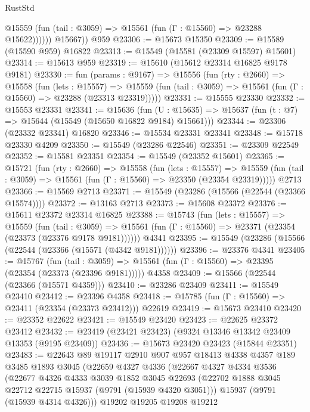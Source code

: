 \begin{lexlean}{RustStd}
\begin{coremodule}
              @15559 (fun (tail : @3059) => @15561 (fun (Γ : @15560) => @23288 @15622))))))
        @15667))
    @959
@23306 := @15673 @15350
@23309 := @15589 (@15590 @959) @16822
@23313 := @15549 (@15581 (@23309 @15597) @15601)
@23314 := @15613 @959
@23319 := @15610 (@15612 @23314 @16825 @9178 @9181)
@23330 := fun (params : @9167) =>
  @15556
    (fun (rty : @2660) =>
    @15558
      (fun (lets : @15557) =>
      @15559 (fun (tail : @3059) => @15561 (fun (Γ : @15560) => @23288 (@23313 @23319)))))
@23331 := @15555 @23330
@23332 := @15553 @23331
@23341 := @15636
    (fun (U : @15635) => @15637 (fun (t : @7) => @15644 (@15549 (@15650 @16822 @9184) @15661)))
@23344 := @23306 (@23332 @23341) @16820
@23346 := @15534 @23331 @23341
@23348 := @15718 @23330 @4209
@23350 := @15549 (@23286 @22546)
@23351 := @23309 @22549
@23352 := @15581 @23351
@23354 := @15549 (@23352 @15601)
@23365 := @15721
    (fun (rty : @2660) =>
    @15558
      (fun (lets : @15557) =>
      @15559 (fun (tail : @3059) => @15561 (fun (Γ : @15560) => @23350 (@23354 @23319)))))
    @2713
@23366 := @15569 @2713
@23371 := @15549 (@23286 (@15566 (@22544 (@23366 @15574))))
@23372 := @13163 @2713
@23373 := @15608 @23372
@23376 := @15611 @23372 @23314 @16825
@23388 := @15743
    (fun (lets : @15557) =>
    @15559
      (fun (tail : @3059) =>
      @15561 (fun (Γ : @15560) => @23371 (@23354 (@23373 (@23376 @9178 @9181))))))
    @4341
@23395 := @15549 (@23286 (@15566 (@22544 (@23366 (@15571 (@4342 @9181))))))
@23396 := @23376 @4341
@23405 := @15767
    (fun (tail : @3059) => @15561 (fun (Γ : @15560) => @23395 (@23354 (@23373 (@23396 @9181)))))
    @4358
@23409 := @15566 (@22544 (@23366 (@15571 @4359)))
@23410 := @23286 @23409
@23411 := @15549 @23410
@23412 := @23396 @4358
@23418 := @15785 (fun (Γ : @15560) => @23411 (@23354 (@23373 @23412))) @22619
@23419 := @15673 @23410
@23420 := @23352 @22622
@23421 := @15549 @23420
@23423 := @22625 @23372 @23412
@23432 := @23419 (@23421 @23423) (@9324 @13346 @13342 @23409 @13353 (@9195 @23409))
@23436 := @15673 @23420 @23423 (@15844 @23351)
@23483 := @22643
    @89
    @19117
    @2910
    @907
    @957
    @18413
    @4338
    @4357
    @189
    @3485
    @1893
    @3045
    (@22659
      @4327
      @4336
      (@22667
        @4327
        @4334
        @3536
        (@22677
          @4326
          @4333
          @3039
          @1852
          @3045
          @22693
          (@22702 @1888 @3045 @22712 @22715 @15937 (@9791 (@15939 @4320 @3051)))
          @15937
          (@9791 (@15939 @4314 @4326)))
        @19202
        @19205
        @19208
        @19212

\end{coremodule}
\end{lexlean}
